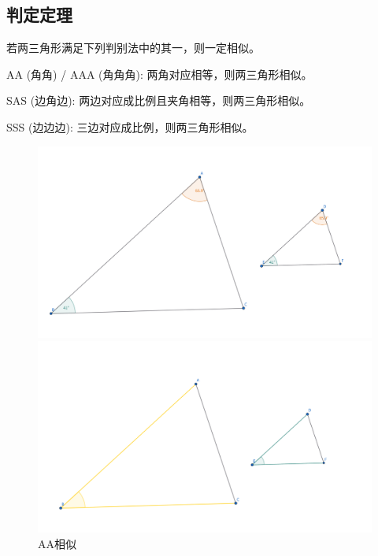 \subsection{判定定理}
\begin{theorem}
    若两三角形满足下列判别法中的其一，则一定相似。

    AA (角角) / AAA (角角角): 两角对应相等，则两三角形相似。
    
    SAS (边角边): 两边对应成比例且夹角相等，则两三角形相似。

    SSS (边边边): 三边对应成比例，则两三角形相似。
\end{theorem}
\begin{figure}[H]
    \centering
    \hfill %
    \begin{minipage}[t]{0.3\textwidth}
        \centering
        \includegraphics[width=\linewidth]{figures/AA相似.png}
        \caption{AA相似}
    \end{minipage}
    \hfill %
    \begin{minipage}[t]{0.3\textwidth}
    \centering
    \includegraphics[width=\linewidth]{figures/SAS相似.png}

\end{minipage}
\end{figure}
